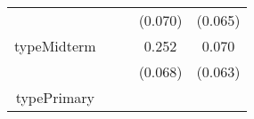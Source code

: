 \documentclass[12pt,twoside]{reedthesis}
\begin{document}
\begin{longtable}[]{@{}ccccc@{}}
\begin{minipage}[t]{0.26\columnwidth}
  \strut
  \end{minipage} & \begin{minipage}[t]{0.12\columnwidth}\centering\strut
  \strut
  \end{minipage} & \begin{minipage}[t]{0.12\columnwidth}\centering\strut
  \strut
  \end{minipage} & \begin{minipage}[t]{0.12\columnwidth}\centering\strut
  (0.070)\strut
  \end{minipage} & \begin{minipage}[t]{0.12\columnwidth}\centering\strut
  (0.065)\strut
  \end{minipage}\tabularnewline
  \begin{minipage}[t]{0.26\columnwidth}\centering\strut
  typeMidterm\strut
  \end{minipage} & \begin{minipage}[t]{0.12\columnwidth}\centering\strut
  \strut
  \end{minipage} & \begin{minipage}[t]{0.12\columnwidth}\centering\strut
  \strut
  \end{minipage} & \begin{minipage}[t]{0.12\columnwidth}\centering\strut
  0.252\strut
  \end{minipage} & \begin{minipage}[t]{0.12\columnwidth}\centering\strut
  0.070\strut
  \end{minipage}\tabularnewline
  \begin{minipage}[t]{0.26\columnwidth}\centering\strut
  \strut
  \end{minipage} & \begin{minipage}[t]{0.12\columnwidth}\centering\strut
  \strut
  \end{minipage} & \begin{minipage}[t]{0.12\columnwidth}\centering\strut
  \strut
  \end{minipage} & \begin{minipage}[t]{0.12\columnwidth}\centering\strut
  (0.068)\strut
  \end{minipage} & \begin{minipage}[t]{0.12\columnwidth}\centering\strut
  (0.063)\strut
  \end{minipage}\tabularnewline
  \begin{minipage}[t]{0.26\columnwidth}\centering\strut
  typePrimary\strut
  \end{minipage} & \begin{minipage}[t]{0.12\columnwidth}\centering\strut

\end{minipage}
\end{longtable}
\end{document}

